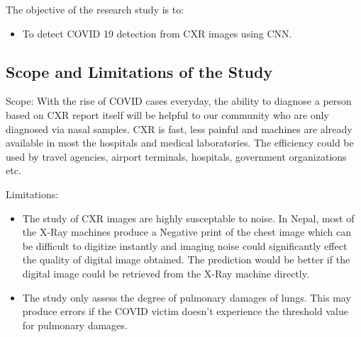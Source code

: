 The objective of the research study is to:
\begin{itemize}
    \item  To detect COVID 19 detection from CXR images using CNN. 
\end{itemize}

\subsection{Scope and Limitations of the Study}

Scope: With the rise of COVID cases everyday, the ability to diagnose a person based on CXR report itself will be helpful to our community who are only diagnosed via nasal samples. CXR is fast, less painful and machines are already available in most the hospitals and medical laboratories. The efficiency could be used by travel agencies, airport terminals, hospitals, government organizations etc.

\vspace{10pt}
Limitations:
\begin{itemize}
    \item The study of CXR images are highly susceptable to noise. In Nepal, most of the X-Ray machines produce a Negative print of the chest image which can be difficult to digitize instantly and imaging noise could significantly effect the quality of digital image obtained. The prediction would be better if the digital image could be retrieved from the X-Ray machine directly.
    \item The study only assess the degree of pulmonary damages of lungs. This may produce errors if the COVID victim doesn't experience the threshold value for pulmonary damages.
\end{itemize}  


